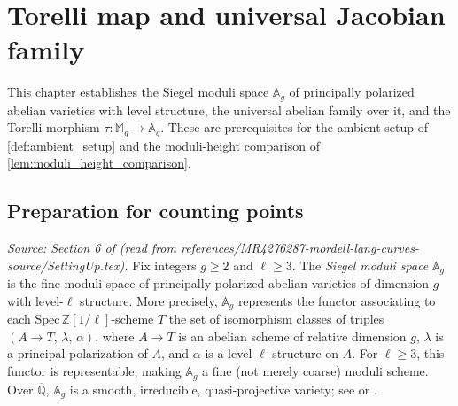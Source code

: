 \chapter{Torelli map and universal Jacobian family}
\label{chap:torelli}

This chapter establishes the Siegel moduli space \(\mathbb{A}_g\) of principally
polarized abelian varieties with level structure, the universal abelian family
over it, and the Torelli morphism \(\tau \colon \mathbb{M}_g \to \mathbb{A}_g\).
These are prerequisites for the ambient setup of \cref{def:ambient_setup} and
the moduli-height comparison of \cref{lem:moduli_height_comparison}.

\section{Preparation for counting points}

\begin{definition}
  \label{def:Ag_level}
  \textit{Source: Section 6 of \cite{MR4276287-mordell-lang-curves} (read from
  references/MR4276287-mordell-lang-curves-source/SettingUp.tex).}
  Fix integers \(g \ge 2\) and \(\ell \ge 3\). The \emph{Siegel moduli space}
  \(\mathbb{A}_g\) is the fine moduli space of principally polarized abelian
  varieties of dimension \(g\) with level-\(\ell\) structure. More precisely,
  \(\mathbb{A}_g\) represents the functor associating to each
  \(\mathrm{Spec}\,\mathbb{Z}[1/\ell]\)-scheme \(T\) the set of isomorphism
  classes of triples \((A \to T,\, \lambda,\, \alpha)\), where \(A \to T\) is an
  abelian scheme of relative dimension \(g\), \(\lambda\) is a principal
  polarization of \(A\), and \(\alpha\) is a level-\(\ell\) structure on \(A\).
  For \(\ell \ge 3\), this functor is representable, making \(\mathbb{A}_g\) a
  fine (not merely coarse) moduli scheme. Over \(\overline{\mathbb{Q}}\),
  \(\mathbb{A}_g\) is a smooth, irreducible, quasi-projective variety; see
  \cite[Theorem~7.9]{MFK:GIT94} or \cite[Theorem~1.9]{OortSteenbrink}.
\end{definition}

